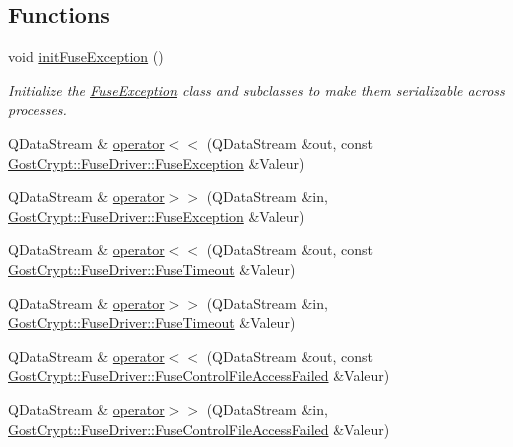 \subsection*{Functions}
\begin{DoxyCompactItemize}
\item 
void \hyperlink{namespace_gost_crypt_1_1_fuse_driver_a10c2b3982f529be695130f2e8277234e}{init\+Fuse\+Exception} ()
\begin{DoxyCompactList}\small\item\em Initialize the \hyperlink{class_gost_crypt_1_1_fuse_driver_1_1_fuse_exception}{Fuse\+Exception} class and subclasses to make them serializable across processes. \end{DoxyCompactList}\item 
Q\+Data\+Stream \& \hyperlink{namespace_gost_crypt_1_1_fuse_driver_a8447fdc700c294915a56b6b9acf08b56}{operator$<$$<$} (Q\+Data\+Stream \&out, const \hyperlink{class_gost_crypt_1_1_fuse_driver_1_1_fuse_exception}{Gost\+Crypt\+::\+Fuse\+Driver\+::\+Fuse\+Exception} \&Valeur)
\item 
Q\+Data\+Stream \& \hyperlink{namespace_gost_crypt_1_1_fuse_driver_a53c7bfa9102b2d0f8597432d302cee23}{operator$>$$>$} (Q\+Data\+Stream \&in, \hyperlink{class_gost_crypt_1_1_fuse_driver_1_1_fuse_exception}{Gost\+Crypt\+::\+Fuse\+Driver\+::\+Fuse\+Exception} \&Valeur)
\item 
Q\+Data\+Stream \& \hyperlink{namespace_gost_crypt_1_1_fuse_driver_aef4cd03d9d871a8a50583895d95482e4}{operator$<$$<$} (Q\+Data\+Stream \&out, const \hyperlink{class_gost_crypt_1_1_fuse_driver_1_1_fuse_timeout}{Gost\+Crypt\+::\+Fuse\+Driver\+::\+Fuse\+Timeout} \&Valeur)
\item 
Q\+Data\+Stream \& \hyperlink{namespace_gost_crypt_1_1_fuse_driver_aac35951e14fe8c2f225f128bc57cf3f5}{operator$>$$>$} (Q\+Data\+Stream \&in, \hyperlink{class_gost_crypt_1_1_fuse_driver_1_1_fuse_timeout}{Gost\+Crypt\+::\+Fuse\+Driver\+::\+Fuse\+Timeout} \&Valeur)
\item 
Q\+Data\+Stream \& \hyperlink{namespace_gost_crypt_1_1_fuse_driver_a96ed1895ad77a48bd148ea73bab31fae}{operator$<$$<$} (Q\+Data\+Stream \&out, const \hyperlink{class_gost_crypt_1_1_fuse_driver_1_1_fuse_control_file_access_failed}{Gost\+Crypt\+::\+Fuse\+Driver\+::\+Fuse\+Control\+File\+Access\+Failed} \&Valeur)
\item 
Q\+Data\+Stream \& \hyperlink{namespace_gost_crypt_1_1_fuse_driver_ab0890a02b7136c5259cf71c93d0095ef}{operator$>$$>$} (Q\+Data\+Stream \&in, \hyperlink{class_gost_crypt_1_1_fuse_driver_1_1_fuse_control_file_access_failed}{Gost\+Crypt\+::\+Fuse\+Driver\+::\+Fuse\+Control\+File\+Access\+Failed} \&Valeur)

\end{DoxyCompactItemize}

